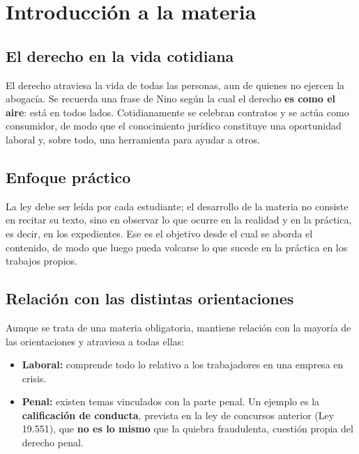 \documentclass[12pt,oneside]{book}
\begin{document}

\chapter[Introducción a la materia]{Introducción a la materia}

\section{El derecho en la vida cotidiana}

El derecho atraviesa la vida de todas las personas, aun de quienes no ejercen la abogacía. Se recuerda una frase de Nino según la cual el derecho \textbf{es como el aire}: está en todos lados. Cotidianamente se celebran contratos y se actúa como consumidor, de modo que el conocimiento jurídico constituye una oportunidad laboral y, sobre todo, una herramienta para ayudar a otros.

\section{Enfoque práctico}

La ley debe ser leída por cada estudiante; el desarrollo de la materia no consiste en recitar su texto, sino en observar lo que ocurre en la realidad y en la práctica, es decir, en los expedientes. Ese es el objetivo desde el cual se aborda el contenido, de modo que luego pueda volcarse lo que sucede en la práctica en los trabajos propios.

\section{Relación con las distintas orientaciones}

Aunque se trata de una materia obligatoria, mantiene relación con la mayoría de las orientaciones y atraviesa a todas ellas:

\begin{itemize}
    \item \textbf{Laboral:} comprende todo lo relativo a los trabajadores en una empresa en crisis.
    \item \textbf{Penal:} existen temas vinculados con la parte penal. Un ejemplo es la \textbf{calificación de conducta}, prevista en la ley de concursos anterior (Ley 19.551), que \textbf{no es lo mismo} que la quiebra fraudulenta, cuestión propia del derecho penal.
\end{itemize}
\end{document}
